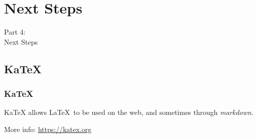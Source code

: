 
{
\renewcommand{\bgcolor}{next}

\section{Next Steps}
\begin{frame}
  \vspace{25mm}
  \begin{center}
    \Huge{Part 4:\\Next Steps}
  \end{center}
\end{frame}

\subsection{KaTeX}
\begin{frame}[fragile]
  \frametitle{KaTeX}
  \vspace{3mm}
  KaTeX allows \LaTeX\ to be used on the web, and sometimes through \textsl{markdown}.
  
  \vspace{5mm}
  More info: \url{https://katex.org}
\end{frame}

}


